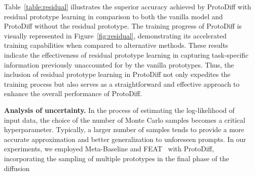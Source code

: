 Table~\ref{table:residual} illustrates the superior accuracy achieved by ProtoDiff with residual prototype learning in comparison to both the vanilla model and ProtoDiff without the residual prototype. The training progress of ProtoDiff is visually represented in Figure~\ref{fig:residual}, demonstrating its accelerated training capabilities when compared to alternative methods. These results indicate the effectiveness of residual prototype learning in capturing task-specific information previously unaccounted for by the vanilla prototypes. Thus, the inclusion of residual prototype learning in ProtoDiff not only expedites the training process but also serves as a straightforward and effective approach to enhance the overall performance of ProtoDiff.


\textbf{Analysis of uncertainty.}
In the process of estimating the log-likelihood of input data, the choice of 
the number of Monte Carlo samples becomes a critical hyperparameter. Typically, a larger number of samples tends to provide a more accurate approximation and better generalization to unforeseen prompts. In our experiments, we employed Meta-Baseline and FEAT~\cite{ye2020few} with ProtoDiff, incorporating the sampling of multiple prototypes in the final phase of the diffusion
